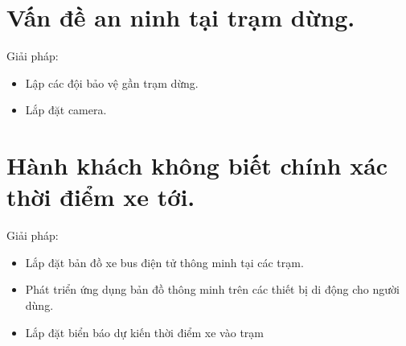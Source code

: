 \section{Vấn đề an ninh tại trạm dừng.}

Giải pháp:

\begin{itemize}
	\item Lập các đội bảo vệ gần trạm dừng.
	\item Lắp đặt camera.
\end{itemize}



\section{Hành khách không biết chính xác thời điểm xe tới.}

Giải pháp:

\begin{itemize}
	\item Lắp đặt bản đồ xe bus điện tử thông minh tại các trạm.
	\item Phát triển ứng dụng bản đồ thông minh trên các thiết bị di động cho người dùng.
	\item Lắp đặt biển báo dự kiến thời điểm xe vào trạm
\end{itemize}